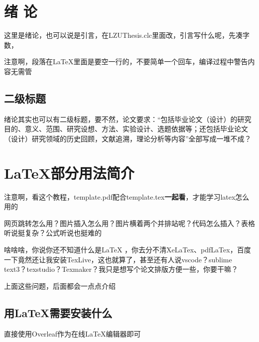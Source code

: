 \documentclass[AutoFakeBold]{LZUThesis}
\begin{document}
\mainmatter

\chapter{\texorpdfstring{绪 \quad 论}{绪论}}


这里是绪论，也可以说是引言，在LZUThesis.clc里面改，引言写什么呢，先凑字数，

注意啊，段落在LaTeX里面是要空一行的，不要简单一个回车，编译过程中警告内容无需管

\section{二级标题}

绪论其实也可以有二级标题，要不然，论文要求：“包括毕业论文（设计）的研究目的、意义、范围、研究设想、方法、实验设计、选题依据等；还包括毕业论文（设计）研究领域的历史回顾，文献追溯，理论分析等内容”全部写成一堆不成？



\chapter{LaTeX部分用法简介}

注意啊，看这个教程，template.pdf配合template.tex\textbf{一起看}，才能学习latex怎么用的

网页跳转怎么用？图片插入怎么用？图片横着两个并排站呢？代码怎么插入？表格听说挺复杂？公式听说也挺难的

啥啥啥，你说你还不知道什么是LaTeX ，你去分不清XeLaTex、pdfLaTex，百度一下竟然还让我安装TexLive，这也就算了，甚至还有人说vscode？sublime text3？texstudio？Texmaker？我只是想写个论文排版方便一些，你要干嘛？

上面这些问题，后面都会一点点介绍

\section{用LaTeX需要安装什么}

直接使用Overleaf作为在线LaTeX编辑器即可
\end{document}
